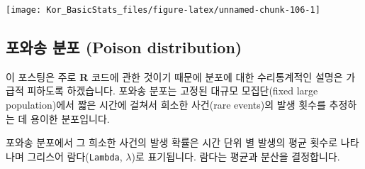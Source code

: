 \documentclass[]{book}
\newenvironment{Shaded}{\begin{snugshade}}{\end{snugshade}}
\newcommand{\CharTok}[1]{\textcolor[rgb]{0.31,0.60,0.02}{#1}}
\newcommand{\DataTypeTok}[1]{\textcolor[rgb]{0.13,0.29,0.53}{#1}}
\newcommand{\DecValTok}[1]{\textcolor[rgb]{0.00,0.00,0.81}{#1}}
\newcommand{\KeywordTok}[1]{\textcolor[rgb]{0.13,0.29,0.53}{\textbf{#1}}}
\newcommand{\NormalTok}[1]{#1}
\newcommand{\OperatorTok}[1]{\textcolor[rgb]{0.81,0.36,0.00}{\textbf{#1}}}
\newcommand{\StringTok}[1]{\textcolor[rgb]{0.31,0.60,0.02}{#1}}
\begin{document}
\begin{Shaded}
\end{Shaded}

\begin{center}\texttt{[image: Kor\_BasicStats\_files/figure-latex/unnamed-chunk-106-1]} \end{center}

\hypertarget{uxd3ecuxc640uxc1a1-uxbd84uxd3ec-poison-distribution}{%
\subsection{포와송 분포 (Poison distribution)}\label{uxd3ecuxc640uxc1a1-uxbd84uxd3ec-poison-distribution}}

이 포스팅은 주로 \textbf{R} 코드에 관한 것이기 때문에 분포에 대한 수리통계적인 설명은 가급적 피하도록 하겠습니다. 포와송 분포는 고정된 대규모 모집단(fixed large population)에서 짧은 시간에 걸쳐서 희소한 사건(rare events)의 발생 횟수를 추정하는 데 용이한 분포입니다.

포와송 분포에서 그 희소한 사건의 발생 확률은 시간 단위 별 발생의 평균 횟수로 나타나며 그리스어 람다(\texttt{Lambda}, \(\lambda\))로 표기됩니다. 람다는 평균과 분산을 결정합니다.
\end{document}
